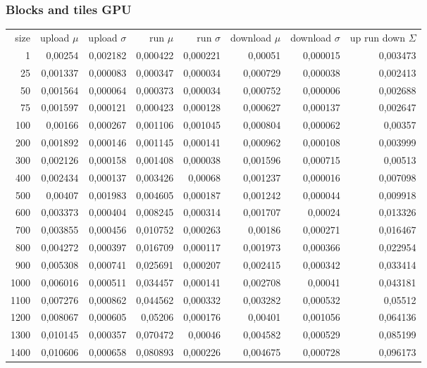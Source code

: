 \subsubsection{Blocks and tiles GPU}

\begin{tabular}{r r r r r r r r}
size & upload $\mu$  & upload $\sigma$ & run $\mu$ & run $\sigma$ & download $\mu$ & download $\sigma$ & up run down $\Sigma$ \\
1 & 0,00254 & 0,002182 & 0,000422 & 0,000221 & 0,00051 & 0,000015 & 0,003473 \\
25 & 0,001337 & 0,000083 & 0,000347 & 0,000034 & 0,000729 & 0,000038 & 0,002413 \\
50 & 0,001564 & 0,000064 & 0,000373 & 0,000034 & 0,000752 & 0,000006 & 0,002688 \\
75 & 0,001597 & 0,000121 & 0,000423 & 0,000128 & 0,000627 & 0,000137 & 0,002647 \\
100 & 0,00166 & 0,000267 & 0,001106 & 0,001045 & 0,000804 & 0,000062 & 0,00357 \\
200 & 0,001892 & 0,000146 & 0,001145 & 0,000141 & 0,000962 & 0,000108 & 0,003999 \\
300 & 0,002126 & 0,000158 & 0,001408 & 0,000038 & 0,001596 & 0,000715 & 0,00513 \\
400 & 0,002434 & 0,000137 & 0,003426 & 0,00068 & 0,001237 & 0,000016 & 0,007098 \\
500 & 0,00407 & 0,001983 & 0,004605 & 0,000187 & 0,001242 & 0,000044 & 0,009918 \\
600 & 0,003373 & 0,000404 & 0,008245 & 0,000314 & 0,001707 & 0,00024 & 0,013326 \\
700 & 0,003855 & 0,000456 & 0,010752 & 0,000263 & 0,00186 & 0,000271 & 0,016467 \\
800 & 0,004272 & 0,000397 & 0,016709 & 0,000117 & 0,001973 & 0,000366 & 0,022954 \\
900 & 0,005308 & 0,000741 & 0,025691 & 0,000207 & 0,002415 & 0,000342 & 0,033414 \\
1000 & 0,006016 & 0,000511 & 0,034457 & 0,000141 & 0,002708 & 0,00041 & 0,043181 \\
1100 & 0,007276 & 0,000862 & 0,044562 & 0,000332 & 0,003282 & 0,000532 & 0,05512 \\
1200 & 0,008067 & 0,000605 & 0,05206 & 0,000176 & 0,00401 & 0,001056 & 0,064136 \\
1300 & 0,010145 & 0,000357 & 0,070472 & 0,00046 & 0,004582 & 0,000529 & 0,085199 \\
1400 & 0,010606 & 0,000658 & 0,080893 & 0,000226 & 0,004675 & 0,000728 & 0,096173 \\

\end{tabular}
